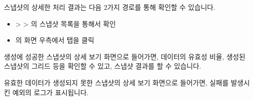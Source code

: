 \documentclass[letterpaper,10pt,english]{sphinxmanual}
\begin{document}
스냅샷의 상세한 처리 결과는 다음 2가지 경로를 통해 확인할 수 있습니다.
\begin{itemize}
\item {} 
 \textgreater{}  \textgreater{} 의 스냅샷 목록을 통해서 확인
\begin{quote}

\begin{figure}[H]
\centering

\noindent{}
\end{figure}
\end{quote}

\item {} 
의 {\hyperref[\detokenize{discovery/part07/edit_rules::doc}]{}} 화면 우측에서  탭을 클릭
\begin{quote}

\begin{figure}[H]
\centering

\noindent{}
\end{figure}
\end{quote}

\end{itemize}

생성에 성공한 스냅샷의 상세 보기 화면으로 들어가면, 데이터의 유효성 비율, 생성된 스냅샷의 그리드 등을 확인할 수 있고, 스냅샷 결과를 {\hyperref[\detokenize{discovery/part07/data_snapshot:snapshot-into-csv}]{}}할 수 있습니다.
\begin{quote}

\begin{figure}[H]
\centering

\noindent{}
\end{figure}
\end{quote}

유효한 데이터가 생성되지 못한 스냅샷의 상세 보기 화면으로 들어가면, 실패를 발생시킨 예외의 로그가 표시됩니다.
\begin{quote}

\begin{figure}[H]
\centering

\noindent{}
\end{figure}
\end{quote}
\end{document}
